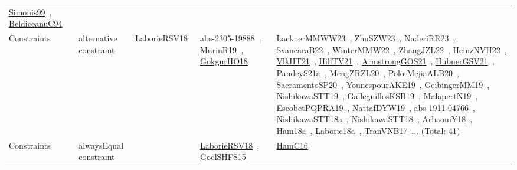 {\begin{longtable}{lp{3cm}>{\raggedright\arraybackslash}p{6cm}>{\raggedright\arraybackslash}p{6cm}>{\raggedright\arraybackslash}p{8cm}}
\href{../works/Simonis99.pdf}{Simonis99}~\cite{Simonis99}, \href{../works/BeldiceanuC94.pdf}{BeldiceanuC94}~\cite{BeldiceanuC94}\\
Constraints & alternative constraint & \href{../works/LaborieRSV18.pdf}{LaborieRSV18}~\cite{LaborieRSV18} & \href{../works/abs-2305-19888.pdf}{abs-2305-19888}~\cite{abs-2305-19888}, \href{../works/MurinR19.pdf}{MurinR19}~\cite{MurinR19}, \href{../works/GokgurHO18.pdf}{GokgurHO18}~\cite{GokgurHO18} & \href{../works/LacknerMMWW23.pdf}{LacknerMMWW23}~\cite{LacknerMMWW23}, \href{../works/ZhuSZW23.pdf}{ZhuSZW23}~\cite{ZhuSZW23}, \href{../works/NaderiRR23.pdf}{NaderiRR23}~\cite{NaderiRR23}, \href{../works/SvancaraB22.pdf}{SvancaraB22}~\cite{SvancaraB22}, \href{../works/WinterMMW22.pdf}{WinterMMW22}~\cite{WinterMMW22}, \href{../works/ZhangJZL22.pdf}{ZhangJZL22}~\cite{ZhangJZL22}, \href{../works/HeinzNVH22.pdf}{HeinzNVH22}~\cite{HeinzNVH22}, \href{../works/VlkHT21.pdf}{VlkHT21}~\cite{VlkHT21}, \href{../works/HillTV21.pdf}{HillTV21}~\cite{HillTV21}, \href{../works/ArmstrongGOS21.pdf}{ArmstrongGOS21}~\cite{ArmstrongGOS21}, \href{../works/HubnerGSV21.pdf}{HubnerGSV21}~\cite{HubnerGSV21}, \href{../works/PandeyS21a.pdf}{PandeyS21a}~\cite{PandeyS21a}, \href{../works/MengZRZL20.pdf}{MengZRZL20}~\cite{MengZRZL20}, \href{../works/Polo-MejiaALB20.pdf}{Polo-MejiaALB20}~\cite{Polo-MejiaALB20}, \href{../works/SacramentoSP20.pdf}{SacramentoSP20}~\cite{SacramentoSP20}, \href{../works/YounespourAKE19.pdf}{YounespourAKE19}~\cite{YounespourAKE19}, \href{../works/GeibingerMM19.pdf}{GeibingerMM19}~\cite{GeibingerMM19}, \href{../works/NishikawaSTT19.pdf}{NishikawaSTT19}~\cite{NishikawaSTT19}, \href{../works/GalleguillosKSB19.pdf}{GalleguillosKSB19}~\cite{GalleguillosKSB19}, \href{../works/MalapertN19.pdf}{MalapertN19}~\cite{MalapertN19}, \href{../works/EscobetPQPRA19.pdf}{EscobetPQPRA19}~\cite{EscobetPQPRA19}, \href{../works/NattafDYW19.pdf}{NattafDYW19}~\cite{NattafDYW19}, \href{../works/abs-1911-04766.pdf}{abs-1911-04766}~\cite{abs-1911-04766}, \href{../works/NishikawaSTT18a.pdf}{NishikawaSTT18a}~\cite{NishikawaSTT18a}, \href{../works/NishikawaSTT18.pdf}{NishikawaSTT18}~\cite{NishikawaSTT18}, \href{../works/ArbaouiY18.pdf}{ArbaouiY18}~\cite{ArbaouiY18}, \href{../works/Ham18a.pdf}{Ham18a}~\cite{Ham18a}, \href{../works/Laborie18a.pdf}{Laborie18a}~\cite{Laborie18a}, \href{../works/TranVNB17.pdf}{TranVNB17}~\cite{TranVNB17}... (Total: 41)\\
Constraints & alwaysEqual constraint &  & \href{../works/LaborieRSV18.pdf}{LaborieRSV18}~\cite{LaborieRSV18}, \href{../works/GoelSHFS15.pdf}{GoelSHFS15}~\cite{GoelSHFS15} & \href{../works/HamC16.pdf}{HamC16}~\cite{HamC16}\\

\end{longtable}}
